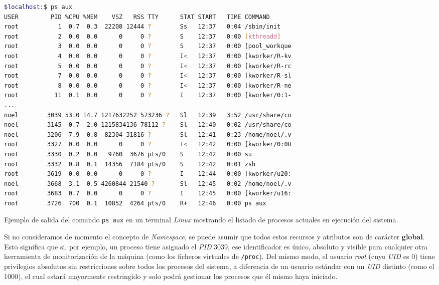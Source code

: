 \begin{code}[h!]
\begin{lstlisting}[language=bash]
$localhost:$ ps aux
USER         PID %CPU %MEM    VSZ   RSS TTY      STAT START   TIME COMMAND
root           1  0.7  0.3  22208 12444 ?        Ss   12:37   0:04 /sbin/init
root           2  0.0  0.0      0     0 ?        S    12:37   0:00 [kthreadd]
root           3  0.0  0.0      0     0 ?        S    12:37   0:00 [pool_workque
root           4  0.0  0.0      0     0 ?        I<   12:37   0:00 [kworker/R-kv
root           5  0.0  0.0      0     0 ?        I<   12:37   0:00 [kworker/R-rc
root           7  0.0  0.0      0     0 ?        I<   12:37   0:00 [kworker/R-sl
root           8  0.0  0.0      0     0 ?        I<   12:37   0:00 [kworker/R-ne
root          11  0.1  0.0      0     0 ?        I    12:37   0:00 [kworker/0:1-
...
noel        3039 53.0 14.7 1217632252 573236 ?   Sl   12:39   3:52 /usr/share/co
noel        3145  0.7  2.0 1215834136 78112 ?    Sl   12:40   0:02 /usr/share/co
noel        3206  7.9  0.8  82304 31816 ?        Sl   12:41   0:23 /home/noel/.v
root        3327  0.0  0.0      0     0 ?        I<   12:42   0:00 [kworker/0:0H
root        3330  0.2  0.0   9760  3676 pts/0    S    12:42   0:00 su
root        3332  0.8  0.1  14356  7184 pts/0    S    12:42   0:01 zsh
root        3619  0.0  0.0      0     0 ?        I    12:44   0:00 [kworker/u20:
noel        3668  3.1  0.5 4260844 21540 ?       Sl   12:45   0:02 /home/noel/.v
root        3683  0.7  0.0      0     0 ?        I    12:45   0:00 [kworker/u16:
root        3726  700  0.1  10852  4264 pts/0    R+   12:46   0:00 ps aux
\end{lstlisting}
\caption[Ejemplo de salida del comando \texttt{ps aux} en un terminal Linux]{Ejemplo de salida del comando \texttt{ps aux} en un terminal \textit{Linux} mostrando el listado de procesos actuales en ejecución del sistema.}
\label{cod:ps_aux}
\end{code}

Si no consideramos de momento el concepto de \textit{Namespace}, se puede asumir que todos estos recursos y atributos son de carácter \textbf{global}.
Esto significa que si, por ejemplo, un proceso tiene asignado el \textit{PID} 3039, ese identificador es único, absoluto y visible para cualquier otra herramienta de monitorización de la máquina (como los ficheros virtuales de \texttt{/proc}).
Del mismo modo, el usuario \textit{root} (cuyo \textit{UID} es 0) tiene privilegios absolutos sin restricciones sobre todos los procesos del sistema,
a diferencia de un usuario estándar con un \textit{UID} distinto (como el 1000), el cual estará mayormente restringido y solo podrá gestionar los procesos que él mismo haya iniciado.\\

